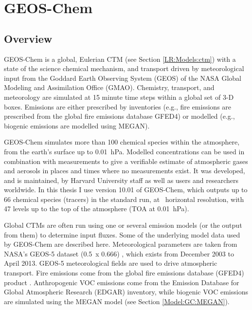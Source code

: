 \section{GEOS-Chem}
\label{Model:GC}

  \subsection{Overview}
    GEOS-Chem is a global, Eulerian CTM (see Section \ref{LR:Models:ctm}) with a state of the science chemical mechanism, and transport driven by meteorological input from the Goddard Earth Observing System (GEOS) of the NASA Global Modeling and Assimilation Office (GMAO).
    Chemistry, transport, and meteorology are simulated at 15 minute time steps within a global set of 3-D boxes.
    Emissions are either prescribed by inventories (e.g., fire emissions are prescribed from the global fire emissions database GFED4) or modelled (e.g., biogenic emissions are modelled using MEGAN).
    
    GEOS-Chem simulates more than 100 chemical species within the atmosphere, from the earth's surface up to 0.01~hPa.
    Modelled concentrations can be used in combination with measurements to give a verifiable estimate of atmospheric gases and aerosols in places and times where no measurements exist.
    It was developed, and is maintained, by Harvard University staff as well as users and researchers worldwide.
    In this thesis I use version 10.01 of GEOS-Chem, which outputs up to 66 chemical species (tracers) in the standard run, at \lowhr ~horizontal resolution, with 47 levels up to the top of the atmosphere (TOA at 0.01~hPa).
    
    
    Global CTMs are often run using one or several emission models (or the output from them) to determine input fluxes.
    Some of the underlying model data used by GEOS-Chem are described here.
    Meteorological parameters are taken from NASA's GEOS-5 dataset (0.5\degr ~x 0.666\degr) \parencite{Chen2009}, which exists from December 2003 to April 2013.
    GEOS-5 meteorological fields are used to drive atmospheric transport.
    Fire emissions come from the global fire emissions database (GFED4) product \parencite{Giglio2013}. 
    Anthropogenic VOC emissions come from the Emission Database for Global Atmospheric Research (EDGAR) inventory, while biogenic VOC emissions are simulated using the MEGAN model (see Section \ref{Model:GC:MEGAN}).


